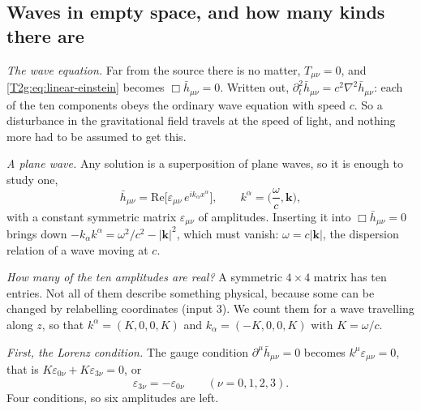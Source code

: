 \subsection{Waves in empty space, and how many kinds there are}

\emph{The wave equation.} Far from the source there is no matter, $T_{\mu\nu}=0$, and \eqref{T2g:eq:linear-einstein} becomes $\Box\bar h_{\mu\nu}=0$. Written out, $\partial_t^2\bar h_{\mu\nu}=c^2\nabla^2\bar h_{\mu\nu}$: each of the ten components obeys the ordinary wave equation with speed $c$. So a disturbance in the gravitational field travels at the speed of light, and nothing more had to be assumed to get this.

\emph{A plane wave.} Any solution is a superposition of plane waves, so it is enough to study one,
\begin{equation}
  \bar h_{\mu\nu}=\mathrm{Re}\big[\varepsilon_{\mu\nu}\,e^{ik_\alpha x^\alpha}\big],\qquad k^\alpha=\Big(\frac\omega c,\bm k\Big),
  \label{T2g:eq:plane}
\end{equation}
with a constant symmetric matrix $\varepsilon_{\mu\nu}$ of amplitudes. Inserting it into $\Box\bar h_{\mu\nu}=0$ brings down $-k_\alpha k^\alpha=\omega^2/c^2-\lvert\bm k\rvert^2$, which must vanish: $\omega=c\lvert\bm k\rvert$, the dispersion relation of a wave moving at $c$.

\emph{How many of the ten amplitudes are real?} A symmetric $4\times4$ matrix has ten entries. Not all of them describe something physical, because some can be changed by relabelling coordinates (input 3). We count them for a wave travelling along $z$, so that $k^\alpha=(K,0,0,K)$ and $k_\alpha=(-K,0,0,K)$ with $K=\omega/c$.

\emph{First, the Lorenz condition.} The gauge condition $\partial^\mu\bar h_{\mu\nu}=0$ becomes $k^\mu\varepsilon_{\mu\nu}=0$, that is $K\varepsilon_{0\nu}+K\varepsilon_{3\nu}=0$, or
\begin{equation}
  \varepsilon_{3\nu}=-\varepsilon_{0\nu}\qquad(\nu=0,1,2,3).
  \label{T2g:eq:lorenz}
\end{equation}
Four conditions, so six amplitudes are left.

